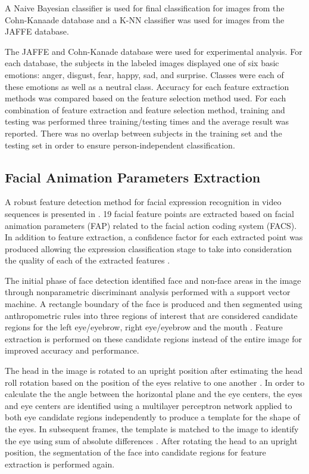 A Naive Bayesian classifier is used for final classification for images from the Cohn-Kanaade database and a K-NN classifier was used for images from the JAFFE database.

The JAFFE and Cohn-Kanade database were used for experimental analysis. For each database, the subjects in the labeled images displayed one of six basic emotions: anger, disgust, fear, happy, sad, and surprise. Classes were each of these emotions as well as a neutral class. Accuracy for each feature extraction methods was compared based on the feature selection method used. For each combination of feature extraction and feature selection method, training and testing was performed three training/testing times and the average result was reported. There was no overlap between subjects in the training set and the testing set in order to ensure person-independent classification. 


\subsection{Facial Animation Parameters Extraction}
A robust feature detection method for facial expression recognition in video sequences is presented in \cite{ioannou2007robust}. 19 facial feature points are extracted based on facial animation parameters (FAP) related to the facial action coding system (FACS). In addition to feature extraction, a confidence factor for each extracted point was produced allowing the expression classification stage to take into consideration the quality of each of the extracted features \cite{ioannou2007robust}.

The initial phase of face detection identified face and non-face areas in the image through nonparametric discriminant analysis performed with a support vector machine\cite{ioannou2007robust}. A rectangle boundary of the face is produced and then segmented using anthropometric rules into three regions of interest that are considered candidate regions for the left eye/eyebrow, right eye/eyebrow and the mouth \cite{ioannou2007robust}. Feature extraction is performed on these candidate regions instead of the entire image for improved accuracy and performance.

The head in the image is rotated to an upright position after estimating the head roll rotation based on the position of the eyes relative to one another \cite{ioannou2007robust}. In order to calculate the the angle between the horizontal plane and the eye centers, the eyes and eye centers are identified using a multilayer perceptron network applied to both eye candidate regions independently to produce a template for the shape of the eyes. In subsequent frames, the template is matched to the image to identify the eye using sum of absolute differences \cite{ioannou2007robust}. After rotating the head to an upright position, the segmentation of the face into candidate regions for feature extraction is performed again.

